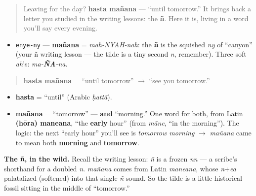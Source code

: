 \label{lesson:ES-C05-hasta-manana}



\begin{quote}
Leaving for the day? \textbf{hasta mañana} — \textquotedblleft{}until tomorrow.\textquotedblright{} It brings back a letter you studied in the writing lessons: the \textbf{ñ}. Here it is, living in a word you'll say every evening.
\end{quote}

\begin{sounds}
\begin{itemize}
\raggedright
  \item \texttt{enye-ny} — \textbf{mañana} = \emph{mah-NYAH-nah}: the \textbf{ñ} is the squished \emph{ny} of \textquotedblleft{}canyon\textquotedblright{} (your ñ writing lesson — the tilde is a tiny second \emph{n}, remember). Three soft \emph{ah}'s: \emph{ma-\textbf{ÑA}-na}.
\end{itemize}
\end{sounds}

\begin{cousinweb}
\begin{quote}
\textbf{hasta mañana} = \textquotedblleft{}until tomorrow\textquotedblright{} $\to$ \textquotedblleft{}see you tomorrow.\textquotedblright{}
\end{quote}

\begin{itemize}
\raggedright
  \item \textbf{hasta} = \textquotedblleft{}until\textquotedblright{} (Arabic \emph{ḥattā}).
  \item \textbf{mañana} = \textquotedblleft{}tomorrow\textquotedblright{} — \textbf{and} \textquotedblleft{}morning.\textquotedblright{} One word for both, from Latin \textbf{(hōra) maneana}, \textquotedblleft{}the \textbf{early} hour\textquotedblright{} (from \emph{māne}, \textquotedblleft{}in the morning\textquotedblright{}). The logic: the next \textquotedblleft{}early hour\textquotedblright{} you'll see is \emph{tomorrow morning} $\to$ \emph{mañana} came to mean both \textbf{morning} and \textbf{tomorrow}.
\end{itemize}

\textbf{The ñ, in the wild.} Recall the writing lesson: \emph{ñ} is a frozen \emph{nn} — a scribe's shorthand for a doubled \emph{n}. \emph{mañana} comes from Latin \emph{maneana}, whose \emph{n}+\emph{ea} palatalized (softened) into that single \emph{ñ} sound. So the tilde is a little historical fossil sitting in the middle of \textquotedblleft{}tomorrow.\textquotedblright{}
\end{cousinweb}

